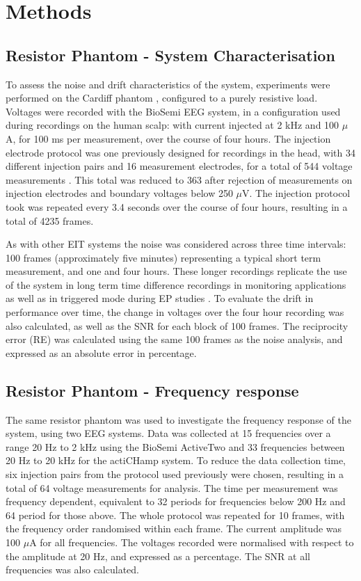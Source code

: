 \section{Methods}
\subsection{Resistor Phantom - System Characterisation}

To assess the noise and drift characteristics of the system, experiments were performed on the Cardiff phantom \cite{griffiths1995cole}, configured to a purely resistive load. Voltages were recorded with the BioSemi EEG system, in a configuration used during recordings on the human scalp: with current injected at 2 kHz and 100 $\mu$A, for 100 ms per measurement, over the course of four hours. The injection electrode protocol was one previously designed for recordings in the head, with 34 different injection pairs and 16 measurement electrodes, for a total of 544 voltage measurements \cite{Fabrizi2009}. This total was reduced to 363 after rejection of measurements on injection electrodes and boundary voltages below 250 $\mu$V. The injection protocol took was repeated every 3.4 seconds over the course of four hours, resulting in a total of 4235 frames. 

As with other EIT systems \cite{oh2007multi} the noise was considered across three time intervals: 100 frames (approximately five minutes) representing a typical short term measurement, and one and four hours. These longer recordings replicate the use of the system in long term time difference recordings in monitoring applications \cite{fu2014use} \cite{adler2012whither} as well as in triggered mode during EP studies \cite{Aristovich_2016}. To evaluate the drift in performance over time, the change in voltages over the four hour recording was also calculated, as well as the SNR for each block of 100 frames. The reciprocity error (RE) was calculated using the same 100 frames as the noise analysis, and expressed as an absolute error in percentage.

\subsection{Resistor Phantom - Frequency response}

The same resistor phantom was used to investigate the frequency response of the system, using two EEG systems. Data was collected at 15 frequencies over a range 20 Hz to 2 kHz using the BioSemi ActiveTwo and 33 frequencies between 20 Hz to 20 kHz for the actiCHamp system. To reduce the data collection time, six injection pairs from the protocol used previously were chosen, resulting in a total of 64 voltage measurements for analysis. The time per measurement was frequency dependent, equivalent to 32 periods for frequencies below 200 Hz and 64 period for those above. The whole protocol was repeated for 10 frames, with the frequency order randomised within each frame. The current amplitude was 100 $\mu$A for all frequencies. The voltages recorded were normalised with respect to the amplitude at 20 Hz, and expressed as a percentage. The SNR at all frequencies was also calculated.  


